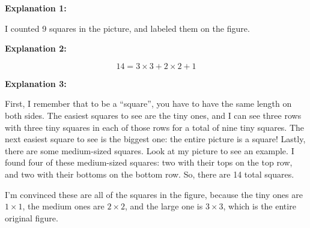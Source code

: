 \documentclass[noauthor,nooutcomes, handout]{ximera}
\begin{document}
\parbox{2.5in}{
\begin{mdframed}

{\bf Explanation 1:}
\begin{center}
\end{center}

I counted 9 squares in the picture, and labeled them on the figure.

\end{mdframed}}
\parbox{2in}{
\begin{mdframed}
{\bf Explanation 2:}

$$ 14 = 3\times 3 + 2\times 2 + 1 $$


\end{mdframed}}

\begin{mdframed}
{\bf Explanation 3:}

First, I remember that to be a ``square'', you have to have the same length on both sides.  The easiest squares to see are the tiny ones, and I can see three rows with three tiny squares in each of those rows for a total of nine tiny squares.  The next easiest square to see is the biggest one: the entire picture is a square!  Lastly, there are some medium-sized squares.  Look at my picture to see an example.  I found four of these medium-sized squares: two with their tops on the top row, and two with their bottoms on the bottom row.  So, there are 14 total squares.


\begin{center}
\end{center}

I'm convinced these are all of the squares in the figure, because the tiny ones are $1\times 1$, the medium ones are $2 \times 2$, and the large one is $3\times 3$, which is the entire original figure.
\end{mdframed}
\end{document}
